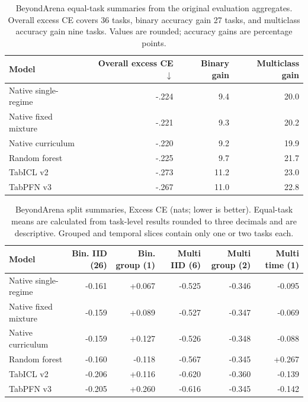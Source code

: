 \begingroup\small\setlength\LTleft{0pt}\setlength\LTright{0pt}
\begin{longtable}{@{}lrrr@{}}
\caption{BeyondArena equal-task summaries from the original evaluation aggregates. Overall excess CE covers 36 tasks, binary accuracy gain 27 tasks, and multiclass accuracy gain nine tasks. Values are rounded; accuracy gains are percentage points.}\label{tab:baoverall}\\
\toprule
Model & Overall excess CE $\downarrow$ & Binary gain & Multiclass gain\\\midrule
Native single-regime & -.224 & 9.4 & 20.0\\
Native fixed mixture & -.221 & 9.3 & 20.2\\
Native curriculum & -.220 & 9.2 & 19.9\\
Random forest & -.225 & 9.7 & 21.7\\
TabICL v2 & -.273 & 11.2 & 23.0\\
TabPFN v3 & -.267 & 11.0 & 22.8\\
\bottomrule\end{longtable}\endgroup
\begingroup\footnotesize\setlength{\tabcolsep}{3pt}\setlength\LTleft{0pt}\setlength\LTright{0pt}
\begin{longtable}{@{}lrrrrr@{}}
\caption{BeyondArena split summaries, Excess CE (nats; lower is better). Equal-task means are calculated from task-level results rounded to three decimals and are descriptive. Grouped and temporal slices contain only one or two tasks each.}\label{tab:splitce}\\
\toprule
Model & Bin. IID (26) & Bin. group (1) & Multi IID (6) & Multi group (2) & Multi time (1)\\\midrule
Native single-regime & -0.161 & +0.067 & -0.525 & -0.346 & -0.095\\
Native fixed mixture & -0.159 & +0.089 & -0.527 & -0.347 & -0.069\\
Native curriculum & -0.159 & +0.127 & -0.526 & -0.348 & -0.088\\
Random forest & -0.160 & -0.118 & -0.567 & -0.345 & +0.267\\
TabICL v2 & -0.206 & +0.116 & -0.620 & -0.360 & -0.139\\
TabPFN v3 & -0.205 & +0.260 & -0.616 & -0.345 & -0.142\\
\bottomrule\end{longtable}\endgroup
\begingroup\footnotesize\setlength{\tabcolsep}{3pt}\setlength\LTleft{0pt}\setlength\LTright{0pt}
